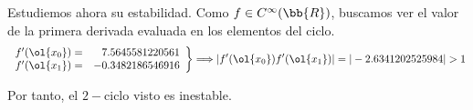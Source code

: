 \begin{ejercicio}
\begin{enumerate}
        Estudiemos ahora su estabilidad. Como $f\in C^\infty(\bb{R})$, buscamos ver el valor de la primera derivada evaluada en los elementos del ciclo.
        \begin{equation*}
            \left.
            \begin{array}{lr}
                f'(\ol{x_0}) =& 7.5645581220561\\
                f'(\ol{x_1}) =& -0.3482186546916\\
            \end{array}
            \right\} \Longrightarrow
            |f'(\ol{x_0})f'(\ol{x_1})| = |-2.6341202525984|>1
        \end{equation*}

        Por tanto, el $2-$ciclo visto es inestable.
    \end{enumerate}
\end{ejercicio}

